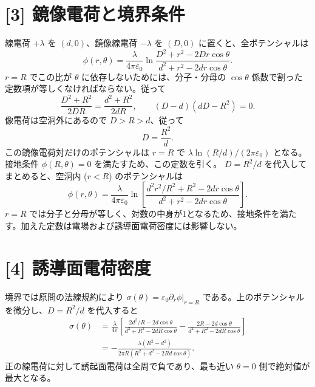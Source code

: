 \documentclass[11pt,a4paper]{article}
\begin{document}
\section*{[3] 鏡像電荷と境界条件}
線電荷 $+\lambda$ を $(d,0)$、鏡像線電荷 $-\lambda$ を $(D,0)$ に置くと、全ポテンシャルは
\begin{equation}
 \phi(r,\theta)=\frac{\lambda}{4\pi\varepsilon_0}
 \ln\frac{D^2+r^2-2Dr\cos\theta}{d^2+r^2-2dr\cos\theta}.
\end{equation}
$r=R$ でこの比が $\theta$ に依存しないためには、分子・分母の $\cos\theta$ 係数で割った定数項が等しくなければならない。従って
\begin{equation}
 \frac{D^2+R^2}{2DR}=\frac{d^2+R^2}{2dR},\qquad
 (D-d)(dD-R^2)=0.
\end{equation}
像電荷は空洞外にあるので $D>R>d$、従って
\begin{equation}
 \boxed{D=\frac{R^2}{d}}.
\end{equation}
この鏡像電荷対だけのポテンシャルは $r=R$ で
$\lambda\ln(R/d)/(2\pi\varepsilon_0)$ となる。接地条件 $\phi(R,\theta)=0$ を満たすため、この定数を引く。
$D=R^2/d$ を代入してまとめると、空洞内 ($r<R$) のポテンシャルは
\begin{equation}
 \boxed{\phi(r,\theta)=\frac{\lambda}{4\pi\varepsilon_0}
 \ln\left[
 \frac{d^2r^2/R^2+R^2-2dr\cos\theta}
 {d^2+r^2-2dr\cos\theta}\right].}
\end{equation}
$r=R$ では分子と分母が等しく、対数の中身が1となるため、接地条件を満たす。加えた定数は電場および誘導面電荷密度には影響しない。

\begin{center}
\end{center}

\section*{[4] 誘導面電荷密度}
境界では原問の法線規約により $\sigma(\theta)=\varepsilon_0\partial_r\phi|_{r=R}$ である。上のポテンシャルを微分し、$D=R^2/d$ を代入すると
\begin{align}
 \sigma(\theta)
 &=\frac{\lambda}{4\pi}\left[
 \frac{2d^2/R-2d\cos\theta}{d^2+R^2-2dR\cos\theta}
 -\frac{2R-2d\cos\theta}{d^2+R^2-2dR\cos\theta}\right]\\
 &=\boxed{-\frac{\lambda(R^2-d^2)}
 {2\pi R(R^2+d^2-2Rd\cos\theta)}}.
\end{align}
正の線電荷に対して誘起面電荷は全周で負であり、最も近い $\theta=0$ 側で絶対値が最大となる。
\end{document}
